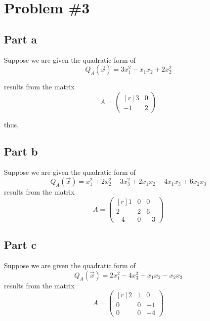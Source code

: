 \documentclass{article}
\begin{document}
\section*{Problem \#3}
\subsection*{Part a}
Suppose we are given the quadratic form of 
\begin{equation*}
    Q_A(\vec{x}) = 3x_1^2 - x_1x_2 + 2x_2^2
\end{equation*}

results from the matrix 
\begin{equation*}
    A = \begin{pmatrix*}[r]
        3 & 0  \\
         -1 & 2 
    \end{pmatrix*}
\end{equation*}

thus,

\subsection*{Part b}
Suppose we are given the quadratic form of 
\begin{equation*}
    Q_A(\vec{x}) = x_1^2 + 2x_2^2 - 3x_3^2 + 2x_1x_2 - 4x_1x_3 + 6x_2x_3
\end{equation*}
results from the matrix 
\begin{equation*}
    A = \begin{pmatrix*}[r]
        1 & 0 & 0 \\
        2 & 2 & 6\\
        -4&0 & -3
    \end{pmatrix*}
\end{equation*}
\subsection*{Part c}
Suppose we are given the quadratic form of 
\begin{equation*}
    Q_A(\vec{x}) = 2x_1^2 - 4x_3^2 + x_1x_2 - x_2x_3
\end{equation*}
results from the matrix 
\begin{equation*}
    A = \begin{pmatrix*}[r]
        2 & 1 & 0\\
       0 & 0 & -1\\
       0 &0  & -4
    \end{pmatrix*}
\end{equation*}
\end{document}

